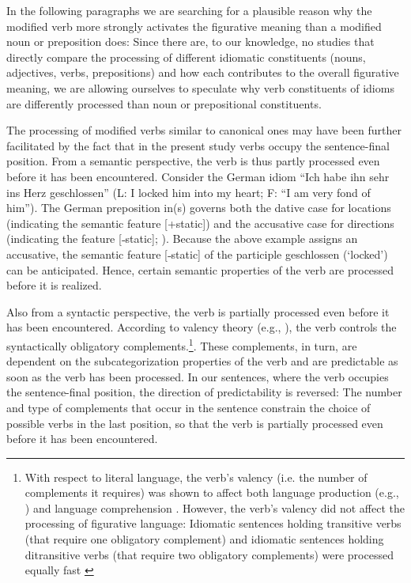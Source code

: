 \documentclass[output=paper]{langsci/langscibook}
\begin{document}
In the following paragraphs we are searching for a plausible reason why the modified verb more strongly activates the figurative meaning than a modified noun or preposition does: Since there are, to our knowledge, no studies that directly compare the processing of different idiomatic constituents (nouns, adjectives, verbs, prepositions) and how each contributes to the overall figurative meaning, we are allowing ourselves to speculate why verb constituents of idioms are differently processed than noun or prepositional constituents. 

The processing of modified verbs similar to canonical ones may have been further facilitated by the fact that in the present study verbs occupy the sentence-final position.  From a semantic perspective, the verb is thus partly processed even before it has been encountered.  Consider the German idiom “Ich habe ihn sehr ins Herz geschlossen” (L: I locked him into my heart; F: “I am very fond of him”). The German preposition in(s) governs both the dative case for locations (indicating the semantic feature [+static]) and the accusative case for directions (indicating the feature [˗static]; \citet{gansel:1992}). Because the above example assigns an accusative, the semantic feature [˗static] of the participle geschlossen (‘locked’) can be anticipated. Hence, certain semantic properties of the verb are processed before it is realized.

Also from a syntactic perspective, the verb is partially processed even before it has been encountered. According to valency theory (e.g., \citet{tesniere:1959}), the verb controls the syntactically obligatory complements.\footnote{With respect to literal language, the verb’s valency (i.e. the number of complements it requires) was shown to affect both language production (e.g., \citet{thompson:1997}) and language comprehension \citep{shapiro:1987}. However, the verb’s valency did not affect the processing of figurative language: Idiomatic sentences holding transitive verbs (that require one obligatory complement) and idiomatic sentences holding ditransitive verbs (that require two obligatory complements) were processed equally fast \citep{dorrestars}}. These complements, in turn, are dependent on the subcategorization properties of the verb and are predictable as soon as the verb has been processed. In our sentences, where the verb occupies the sentence-final position, the direction of predictability is reversed: The number and type of complements that occur in the sentence constrain the choice of possible verbs in the last position, so that the verb is partially processed even before it has been encountered.
\end{document}
